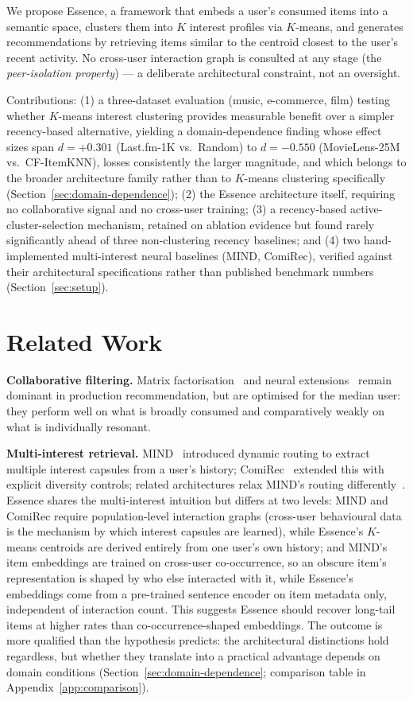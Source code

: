 \documentclass{article}
\begin{document}
We propose Essence, a framework that embeds a user's consumed items into a semantic space, clusters them into $K$ interest profiles via $K$-means, and generates recommendations by retrieving items similar to the centroid closest to the user's recent activity. No cross-user interaction graph is consulted at any stage (the \emph{peer-isolation property}) --- a deliberate architectural constraint, not an oversight.

Contributions: (1) a three-dataset evaluation (music, e-commerce, film) testing whether $K$-means interest clustering provides measurable benefit over a simpler recency-based alternative, yielding a domain-dependence finding whose effect sizes span $d=+0.301$ (Last.fm-1K vs.\ Random) to $d=-0.550$ (MovieLens-25M vs.\ CF-ItemKNN), losses consistently the larger magnitude, and which belongs to the broader architecture family rather than to $K$-means clustering specifically (Section~\ref{sec:domain-dependence}); (2) the Essence architecture itself, requiring no collaborative signal and no cross-user training; (3) a recency-based active-cluster-selection mechanism, retained on ablation evidence but found rarely significantly ahead of three non-clustering recency baselines; and (4) two hand-implemented multi-interest neural baselines (MIND, ComiRec), verified against their architectural specifications rather than published benchmark numbers (Section~\ref{sec:setup}).

\section{Related Work}
\label{sec:related}

\textbf{Collaborative filtering.} Matrix factorisation~\cite{koren2009} and neural extensions~\cite{he2017} remain dominant in production recommendation, but are optimised for the median user: they perform well on what is broadly consumed and comparatively weakly on what is individually resonant.

\textbf{Multi-interest retrieval.} MIND~\cite{li2019} introduced dynamic routing to extract multiple interest capsules from a user's history; ComiRec~\cite{cen2020} extended this with explicit diversity controls; related architectures relax MIND's routing differently~\cite{tan2021,zhang2022}. Essence shares the multi-interest intuition but differs at two levels: MIND and ComiRec require population-level interaction graphs (cross-user behavioural data is the mechanism by which interest capsules are learned), while Essence's $K$-means centroids are derived entirely from one user's own history; and MIND's item embeddings are trained on cross-user co-occurrence, so an obscure item's representation is shaped by who else interacted with it, while Essence's embeddings come from a pre-trained sentence encoder on item metadata only, independent of interaction count. This suggests Essence should recover long-tail items at higher rates than co-occurrence-shaped embeddings. The outcome is more qualified than the hypothesis predicts: the architectural distinctions hold regardless, but whether they translate into a practical advantage depends on domain conditions (Section~\ref{sec:domain-dependence}; comparison table in Appendix~\ref{app:comparison}).
\end{document}
